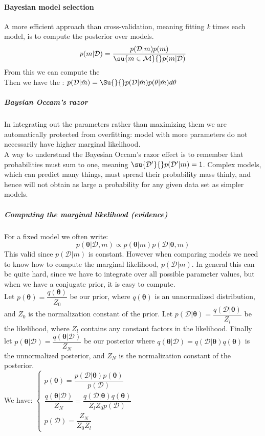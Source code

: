 \paragraph{Bayesian model selection}
A more efficient approach than cross-validation, meaning fitting \emph{k} times each
model, is to compute the posterior over models.
$$
p(m|\mathcal{D}) = \dfrac{p(\mathcal{D}|m)p(m)}{\su{{m\in\mathcal{M}}}{}p(m|\mathcal{D})}
$$
From this we can compute the \\
Then we have the : $p(\mathcal{D}|\hat{m}) = \Su{}{}p(
\mathcal{D}|\hat{m})p(\theta|\hat{m})d\theta$
\subparagraph{Baysian Occam's razor}
In integrating out the parameters rather than maximizing them we are automatically 
protected from overfitting: model with more parameters do not necessarily have higher 
marginal likelihood.\\
A way to understand the Bayesian Occam's razor effect is to remember that probabilities 
must sum to one, meaning $\su{{\mathcal{D}'}}{}p(\mathcal{D}'|m)=1$. Complex models, which
can predict many things, must spread their probability mass thinly, and hence will not
obtain as large a probability for any given data set as simpler models.

\subparagraph{Computing the marginal likelihood (evidence)}
For a fixed model we often write:
$$p(\bm{\theta}|\mathcal{D},m) \propto p(\bm{\theta}|m)p(\mathcal{D}|\bm{\theta},m)$$
This valid since $p(\mathcal{D}|m)$ is constant. However when comparing models we need
to know how to compute the marginal likelihood, $p(\mathcal{D}|m)$. In general this can
be quite hard, since we have to integrate over all possible parameter values, but when
we have a conjugate prior, it is easy to compute.\\
Let $p(\bm{\theta})=\dfrac{q(\bm{\theta})}{Z_{0}}$ be our prior, where $q(\bm{\theta})$
is an unnormalized distribution, and $Z_{0}$ is the normalization constant of the prior.
Let $p(\mathcal{D}|\bm{\theta})=\dfrac{q(\mathcal{D}|\bm{\theta})}{Z_{l}}$ be the 
likelihood, where $Z_{l}$ contains any constant factors in the likelihood. Finally let
$p(\bm{\theta}|\mathcal{D})=\dfrac{q(\bm{\theta}|\mathcal{D})}{Z_{N}}$ be our posterior
where $q(\bm{\theta}|\mathcal{D})=q(\mathcal{D}|\bm{\theta})q(\bm{\theta})$ is the 
unnormalized posterior, and $Z_{N}$ is the normalization constant of the posterior.\\
We have:
$
\begin{cases}
	p(\bm{\theta})= \dfrac{p(\mathcal{D}|\bm{\theta})p(\bm{\theta})}{p(\mathcal{D})}\\
	\dfrac{q(\bm{\theta}|\mathcal{D})}{Z_{N}} = \dfrac{q(\mathcal{D}|\bm{\theta})
	q(\bm{\theta})}{Z_{l}Z_{0}p(\mathcal{D})}\\
	p(\mathcal{D}) = \dfrac{Z_{N}}{Z_{0}Z_{l}}
\end{cases}
$

